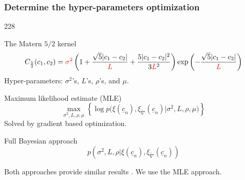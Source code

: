 \documentclass{beamer}
\let\oldcite=\cite
\renewcommand{\cite}[1]{\textcolor[rgb]{.4,.4,.85}{\oldcite{#1}}}
\newcommand{\barrow}{\item[\color{darkred}\ding{228}]}
\begin{document}
\begin{frame}
    \frametitle{Determine the hyper-parameters \hfill \scriptsize{optimization}}\small
            \begin{dinglist}{228}
                \barrow
                The Matern $5/2$ kernel \scriptsize\cite{Matern 60, Snoek 12} \small
                $$
                    C_{\frac{5}{2}}(c_1,c_2) = \textcolor{red}{\sigma^2}
                    \left(1+ \frac{\sqrt{5}|c_1-c_2|}{\textcolor{red}{L}}
                    + \frac{5|c_1-c_2|^2}{ 3\textcolor{red}{L}^2}\right)
                    \exp\left(-\frac{\sqrt{5}|c_1-c_2|}{\textcolor{red}{L}}\right) 
                $$
                Hyper-parameters: $\sigma^2$'s, $L$'s, $\rho$'s, and $\mu$.
                \barrow 
                Maximum likelihood estimate (MLE)\scriptsize\cite{Jones 98}\small
                $$
                \max_{\sigma^2, L, \rho, \mu}\left\{ \log p\big(\xi(\underline{c}_n), \xi_{\tilde{\nabla}}(\underline{c}_n) \big| \sigma^2, L, \rho, \mu \big)\right\}
                $$
                Solved by gradient based optimization.
                \barrow Full Bayesian approach \scriptsize \cite{Higdon 04, Kennedy 01}\small
                $$
                    p(\sigma^2, L, \rho \big| 
                    \xi(\underline{c}_n), \xi_{\tilde{\nabla}}(\underline{c}_n))
                $$
                \barrow Both approaches provide similar results \scriptsize\cite{Bayarri 07} \small. 
                        We use the MLE approach.
           \end{dinglist}
\end{frame}
\end{document}
